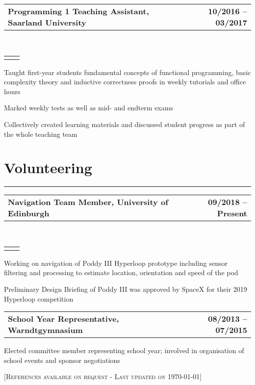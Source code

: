 \documentclass[]{deedy-resume}
\makeatletter
\newcommand{\headerrow}[2]
{\begin{tabular*}{\linewidth}{l@{\extracolsep{\fill}}r}
	\fontspec{Helvetica}\fontsize{12pt}{12pt}\selectfont\bfseries{\color{subheadings}#1} &
	\fontspec{Helvetica}\fontsize{12pt}{12pt}\selectfont\bfseries{\color{subheadings}#2} \\
\end{tabular*}}
\newcommand{\locationrow}[2]
{\begin{tabular*}{\linewidth}{l@{\extracolsep{\fill}}r}
        \color{headings}\scshape\fontspec{Heiti TC Medium}\fontsize{10pt}{12pt}\selectfont{#1}  &
        \color{headings}\scshape\fontspec{Heiti TC Medium}\fontsize{10pt}{12pt}\selectfont{#2}  \\
\end{tabular*}}
\makeatother
\begin{document}
\noindent
\headerrow{Programming 1 Teaching Assistant, Saarland University}{10/2016 -- 03/2017}
\\
\locationrow{Dependable Systems and Software Group}{}
\begin{tightitemize}{1.7em}
    \item Taught first-year students fundamental concepts of functional programming, basic complexity theory and inductive correctness proofs in weekly tutorials and office hours
    \item Marked weekly tests as well as mid- and endterm exams
    \item Collectively created learning materials and discussed student progress as part of the whole teaching team
\end{tightitemize}
\largesectionsep


\section*{Volunteering}
\hrule
\vspace{0.4em}

\noindent
\headerrow{Navigation Team Member, University of Edinburgh}{09/2018 -- Present}
\\
\locationrow{HYPED -- University of Edinburgh Hyperloop Society}{}
\begin{tightitemize}{1.7em}
    \item Working on navigation of Poddy III Hyperloop prototype including sensor filtering and processing
    to estimate location, orientation and speed of the pod
    \item Preliminary Design Briefing of Poddy III was approved by SpaceX for their 2019 Hyperloop competition
\end{tightitemize}
\largesectionsep


\noindent
\headerrow{School Year Representative, Warndtgymnasium}{08/2013 -- 07/2015}
\begin{tightitemize}{1.7em}
    \item Elected committee member representing school year; involved in organisation of school events and sponsor
    negotiations
\end{tightitemize}
\largesectionsep

[\scshape{}\fontsize{10pt}{8pt}\selectfont References available on request - Last updated on \today]
\end{document}
